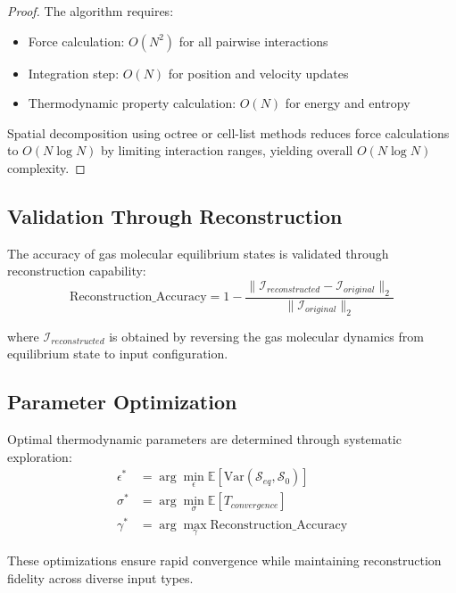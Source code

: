 \documentclass[11pt,a4paper]{article}
\begin{document}
\begin{proof}
The algorithm requires:
\begin{itemize}
\item Force calculation: $O(N^2)$ for all pairwise interactions
\item Integration step: $O(N)$ for position and velocity updates  
\item Thermodynamic property calculation: $O(N)$ for energy and entropy
\end{itemize}

Spatial decomposition using octree or cell-list methods reduces force calculations to $O(N \log N)$ by limiting interaction ranges, yielding overall $O(N \log N)$ complexity.
\end{proof}

\subsection{Validation Through Reconstruction}

The accuracy of gas molecular equilibrium states is validated through reconstruction capability:
\begin{equation}
\text{Reconstruction\_Accuracy} = 1 - \frac{\|\mathcal{I}_{reconstructed} - \mathcal{I}_{original}\|_2}{\|\mathcal{I}_{original}\|_2}
\label{eq:reconstruction-accuracy}
\end{equation}

where $\mathcal{I}_{reconstructed}$ is obtained by reversing the gas molecular dynamics from equilibrium state to input configuration.

\subsection{Parameter Optimization}

Optimal thermodynamic parameters are determined through systematic exploration:
\begin{align}
\epsilon^* &= \arg\min_{\epsilon} \mathbb{E}[\text{Var}(\mathcal{S}_{eq}, \mathcal{S}_0)] \label{eq:epsilon-optimization} \\
\sigma^* &= \arg\min_{\sigma} \mathbb{E}[T_{convergence}] \label{eq:sigma-optimization} \\
\gamma^* &= \arg\max_{\gamma} \text{Reconstruction\_Accuracy} \label{eq:gamma-optimization}
\end{align}

These optimizations ensure rapid convergence while maintaining reconstruction fidelity across diverse input types.
\end{document}
